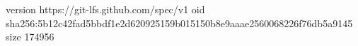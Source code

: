 version https://git-lfs.github.com/spec/v1
oid sha256:5b12c42fad5bbdf1e2d620925159b015150b8e9aaae2560068226f76db5a9145
size 174956
